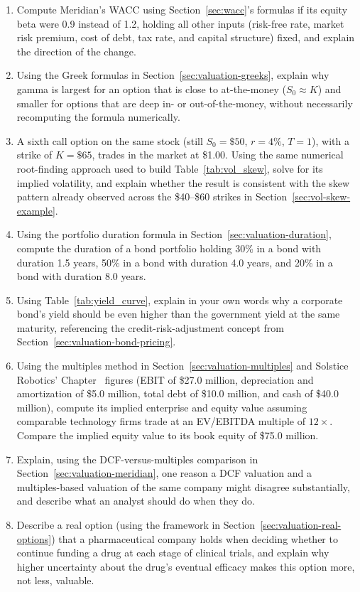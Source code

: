 \documentclass[../ai_in_finance]{subfiles}
\begin{document}
\begin{enumerate}[exercises]
    \item Compute Meridian's WACC using Section~\ref{sec:wacc}'s formulas if its equity beta were 0.9 instead of 1.2, holding all other inputs (risk-free rate, market risk premium, cost of debt, tax rate, and capital structure) fixed, and explain the direction of the change.
    \item Using the Greek formulas in Section~\ref{sec:valuation-greeks}, explain why gamma is largest for an option that is close to at-the-money ($S_0 \approx K$) and smaller for options that are deep in- or out-of-the-money, without necessarily recomputing the formula numerically.
    \item A sixth call option on the same stock (still $S_0=\$50$, $r=4\%$, $T=1$), with a strike of $K=\$65$, trades in the market at \$1.00. Using the same numerical root-finding approach used to build Table~\ref{tab:vol_skew}, solve for its implied volatility, and explain whether the result is consistent with the skew pattern already observed across the \$40--\$60 strikes in Section~\ref{sec:vol-skew-example}.
    \item Using the portfolio duration formula in Section~\ref{sec:valuation-duration}, compute the duration of a bond portfolio holding 30\% in a bond with duration 1.5 years, 50\% in a bond with duration 4.0 years, and 20\% in a bond with duration 8.0 years.
    \item Using Table~\ref{tab:yield_curve}, explain in your own words why a corporate bond's yield should be even higher than the government yield at the same maturity, referencing the credit-risk-adjustment concept from Section~\ref{sec:valuation-bond-pricing}.
    \item Using the multiples method in Section~\ref{sec:valuation-multiples} and Solstice Robotics' Chapter~ figures (EBIT of \$27.0 million, depreciation and amortization of \$5.0 million, total debt of \$10.0 million, and cash of \$40.0 million), compute its implied enterprise and equity value assuming comparable technology firms trade at an EV/EBITDA multiple of $12\times$. Compare the implied equity value to its book equity of \$75.0 million.
    \item Explain, using the DCF-versus-multiples comparison in Section~\ref{sec:valuation-meridian}, one reason a DCF valuation and a multiples-based valuation of the same company might disagree substantially, and describe what an analyst should do when they do.
    \item Describe a real option (using the framework in Section~\ref{sec:valuation-real-options}) that a pharmaceutical company holds when deciding whether to continue funding a drug at each stage of clinical trials, and explain why higher uncertainty about the drug's eventual efficacy makes this option more, not less, valuable.

\end{enumerate}
\end{document}
